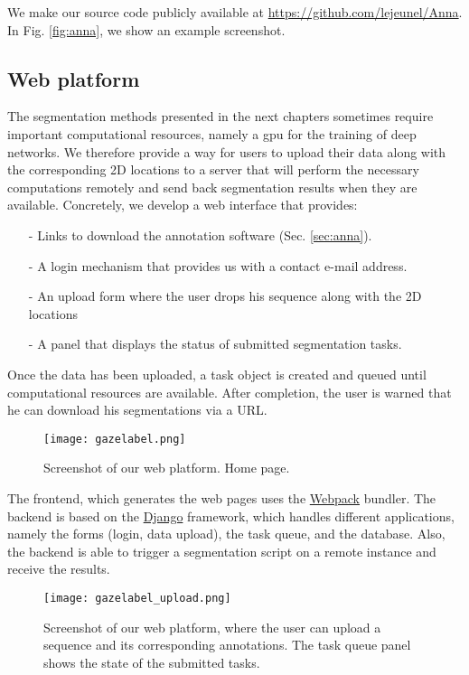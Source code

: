 We make our source code publicly available at \url{https://github.com/lejeunel/Anna}.
In Fig. \ref{fig:anna}, we show an example screenshot.


\subsection{Web platform}
The segmentation methods presented in the next chapters sometimes require important computational
resources, namely a \gls{gpu} for the training of deep networks.
We therefore provide a way for users to upload their data along with the corresponding 2D locations
to a server that will perform the necessary computations remotely and send back segmentation
results when they are available.
Concretely, we develop a web interface that provides:

\begin{itemize}
  \item[-]{Links to download the annotation software (Sec. \ref{sec:anna}).}
  \item[-]{A login mechanism that provides us with a contact e-mail address.}
  \item[-]{An upload form where the user drops his sequence along with the 2D locations}
  \item[-]{A panel that displays the status of submitted segmentation tasks.}
\end{itemize}

Once the data has been uploaded, a task object is created and queued until computational resources are available.
After completion, the user is warned that he can download his segmentations via a URL.

\begin{figure}[!htpb]
  \texttt{[image: gazelabel.png]}
  \caption{Screenshot of our web platform. Home page.}
  \label{fig:homepage}
\end{figure}

The frontend, which generates the web pages uses the \href{https://webpack.js.org}{Webpack} bundler.
The backend is based on the \href{https://www.djangoproject.com/}{Django} framework, which handles different applications, namely the forms (login, data upload), the task queue, and the database.
Also, the backend is able to trigger a segmentation script on a remote instance and receive the results.

\begin{figure}[!htpb]
  \texttt{[image: gazelabel\_upload.png]}
  \caption{Screenshot of our web platform, where the user can upload a sequence and its corresponding annotations. The task queue panel shows the state of the submitted tasks.}
  \label{fig:upload}
\end{figure}

